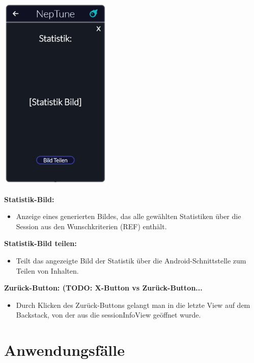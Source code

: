 \documentclass[oneside, ngerman]{sdqtechreport}
\begin{document}
\begin{center}
    \hypertarget{sessionStatsView}{}
    \includegraphics[width=0.4\textwidth]{LATEX/Pflichtenheft/GraphicDesigns/statisticsPopUpPage.png}
\end{center}

\textbf{Statistik-Bild:}
\begin{itemize}
    \item Anzeige eines generierten Bildes, das alle gewählten Statistiken über die Session aus den Wunschkriterien (REF) enthält.
\end{itemize}

\textbf{Statistik-Bild teilen:}
\begin{itemize}
    \item Teilt das angezeigte Bild der Statistik über die Android-Schnittstelle zum Teilen von Inhalten.
\end{itemize}

\textbf{Zurück-Button: (TODO: X-Button vs Zurück-Button...}
\begin{itemize}
    \item Durch Klicken des Zurück-Buttons gelangt man in die letzte View auf dem Backstack, von der aus die sessionInfoView geöffnet wurde.
\end{itemize}


\chapter{Anwendungsfälle}
\label{chap:Anwendungsfälle}
\end{document}
